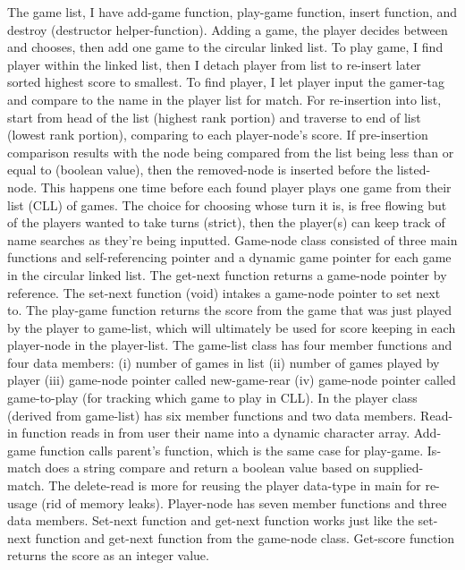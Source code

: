 \documentclass[11pt, a4paper]{article}
\begin{document}
The game list, I have add-game function, play-game function, insert function, and destroy (destructor helper-function). Adding a game, the player decides between and chooses, then add one game to the circular linked list. To play game, I find player within the linked list, then I detach player from list to re-insert later sorted highest score to smallest. To find player, I let player input the gamer-tag and compare to the name in the player list for match. For re-insertion into list, start from head of the list (highest rank portion) and traverse to end of list (lowest rank portion), comparing to each player-node's score. If pre-insertion comparison results with the node being compared from the list being less than or equal to (boolean value), then the removed-node is inserted before the listed-node. This happens one time before each found player plays one game from their list (CLL) of games. The choice for choosing whose turn it is, is free flowing but of the players wanted to take turns (strict), then the player(s) can keep track of name searches as they're being inputted. Game-node class consisted of three main functions and self-referencing pointer and a dynamic game pointer for each game in the circular linked list. The get-next function returns a game-node pointer by reference. The set-next function (void) intakes a game-node pointer to set next to. The play-game function returns the score from the game that was just played by the player to game-list, which will ultimately be used for score keeping in each player-node in the player-list. The game-list class has four member functions and four data members: (i) number of games in list (ii) number of games played by player (iii) game-node pointer called new-game-rear (iv) game-node pointer called game-to-play (for tracking which game to play in CLL). In the player class (derived from game-list) has six member functions and two data members. Read-in function reads in from user their name into a dynamic character array. Add-game function calls parent's function, which is the same case for play-game. Is-match does a string compare and return a boolean value based on supplied-match. The delete-read is more for reusing the player data-type in main for re-usage (rid of memory leaks). Player-node has seven member functions and three data members. Set-next function and get-next function works just like the set-next function and get-next function from the game-node class. Get-score function returns the score as an integer value.
\end{document}
